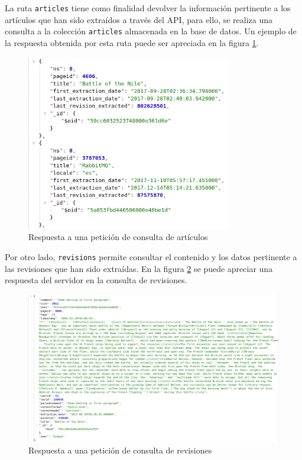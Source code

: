 La ruta \texttt{articles} tiene como finalidad devolver la información pertinente a los artículos que han sido extraídos a través del API, para ello, se realiza una consulta a la colección \texttt{articles} almacenada en la base de datos. Un ejemplo de la respuesta obtenida por esta ruta puede ser apreciada en la figura \ref{fig:response_articles}.

\begin{figure}[H]
	\centering
		\includegraphics[width=0.8\textwidth]{figures/response_articles}
	\caption{Respuesta a una petición de consulta de artículos}
	\label{fig:response_articles}
\end{figure}

Por otro lado, \texttt{revisions} permite consultar el contenido y los datos pertinente a las revisiones que han sido extraídas.
En la figura \ref{fig:response_revisions} se puede apreciar una respuesta del servidor en la consulta de revisiones.

\begin{figure}[H]
	\centering
		\includegraphics[width=1\textwidth]{figures/response_revisions}
	\caption{Respuesta a una petición de consulta de revisiones}
	\label{fig:response_revisions}
\end{figure}

